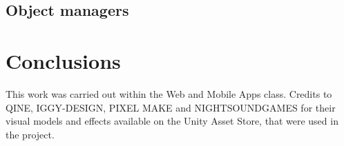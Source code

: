 \documentclass[sigconf]{acmart}
\begin{document}
\subsection{Object managers}
\section{Conclusions}
\begin{acks}
This work was carried out within the Web and Mobile Apps class.
Credits to QINE, IGGY-DESIGN, PIXEL MAKE and NIGHTSOUNDGAMES for their visual models and effects available on the Unity Asset Store, that were used in the project.
\end{acks}



\end{document}

